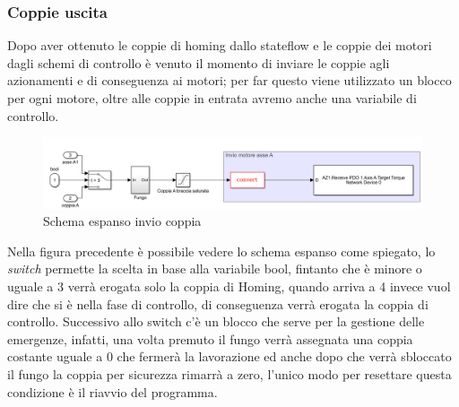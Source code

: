 \subsubsection*{Coppie uscita}
Dopo aver ottenuto le coppie di homing dallo stateflow e le coppie dei motori dagli schemi di controllo è venuto il momento di inviare le coppie agli azionamenti e di conseguenza ai motori; per far questo viene utilizzato un blocco per ogni motore, oltre alle coppie in entrata avremo anche una variabile di controllo. 
\begin{figure}[ht]
	\begin{center}
		\includegraphics[scale=0.55]{Immagini/Sperimentale/Saturatore}
		\caption{Schema espanso invio coppia}
			\label{fig:CoppieoutExpanded}
	\end{center}
\end{figure}
Nella figura precedente è possibile vedere lo schema espanso come spiegato, lo \textit{switch} permette la scelta in base alla variabile bool, fintanto che è minore o uguale a 3 verrà erogata solo la coppia di Homing, quando arriva a 4 invece vuol dire che si è nella fase di controllo, di conseguenza verrà erogata la coppia di controllo. Successivo allo switch c'è un blocco che serve per la gestione delle emergenze, infatti, una volta premuto il fungo verrà assegnata una coppia costante uguale a 0 che fermerà la lavorazione ed anche dopo che verrà sbloccato il fungo la coppia per sicurezza rimarrà a zero, l'unico modo per resettare questa condizione è il riavvio del programma.
